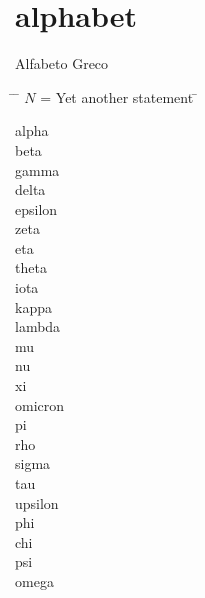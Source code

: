 \documentclass[../main.tex]{subfiles}
\begin{document}
\section{alphabet}
Alfabeto Greco

\begin{multicols}{2}
\begin{tabbing}
\hspace{2em} \= \hspace{3em} \= $N$ = Yet another statement \= \kill

\textAlpha    \>  \textalpha    \>  alpha    \\
\textBeta     \>  \textbeta     \>  beta     \\
\textGamma    \>  \textgamma    \>  gamma    \\
\textDelta    \>  \textdelta    \>  delta    \\
\textEpsilon  \>  \textepsilon  \straightepsilon  \>  epsilon  \\
\textZeta     \>  \textzeta     \>  zeta     \\
\textEta      \>  \texteta      \>  eta      \\
\textTheta    \>  \texttheta  \straighttheta   \>  theta    \\
\textIota     \>  \textiota     \>  iota     \\
\textKappa    \>  \textkappa    \>  kappa    \\
\textLambda   \>  \textlambda   \>  lambda   \\
\textMu       \>  \textmu       \>  mu       \\
\textNu       \>  \textnu       \>  nu       \\
\textXi       \>  \textxi       \>  xi       \\
\textOmikron  \>  \textomikron  \>  omicron  \\
\textPi       \>  \textpi       \>  pi       \\
\textRho      \>  \textrho      \>  rho      \\
\textSigma    \>  \textsigma    \>  sigma    \\
\textTau      \>  \texttau      \>  tau      \\
\textUpsilon  \>  \textupsilon  \>  upsilon  \\
\textPhi      \>  \textphi  \straightphi    \>  phi      \\
\textChi      \>  \textchi      \>  chi      \\
\textPsi      \>  \textpsi      \>  psi      \\
\textOmega    \>  \textomega    \>  omega    \\

\end{tabbing}
\end{multicols}
\end{document}
